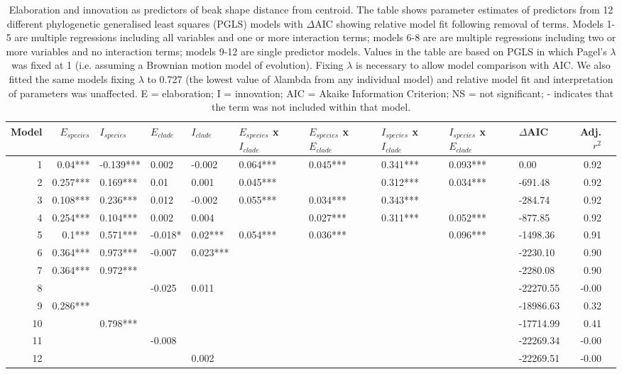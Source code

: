 \documentclass[12pt,letterpaper]{article}
\begin{document}
\begin{landscape}
\begin{table}[ht]
\centering
\small
   \begin{tabular}{rrllllllllrr}
     \hline
    Model & $E_{species}$ & $I_{species}$ & $E_{clade}$ & $I_{clade}$ & $E_{species}$ x $I_{clade}$ & $E_{species}$ x $E_{clade}$ & $I_{species}$ x $I_{clade}$ & $I_{species}$ x $E_{clade}$ & $\Delta$AIC & Adj. $r^2$ \\ 
     \hline
   1 & 0.04*** & -0.139*** & 0.002 & -0.002 & 0.064*** & 0.045*** & 0.341*** & 0.093*** & 0.00 & 0.92 \\ 
   2 & 0.257*** & 0.169*** & 0.01 & 0.001 & 0.045*** &  & 0.312*** & 0.034*** & -691.48 & 0.92 \\ 
   3 & 0.108*** & 0.236*** & 0.012 & -0.002 & 0.055*** & 0.034*** & 0.343*** &  & -284.74 & 0.92 \\ 
   4 & 0.254*** & 0.104*** & 0.002 & 0.004 &  & 0.027*** & 0.311*** & 0.052*** & -877.85 & 0.92 \\ 
   5 & 0.1*** & 0.571*** & -0.018* & 0.02*** & 0.054*** & 0.036*** &  & 0.096*** & -1498.36 & 0.91 \\ 
   6 & 0.364*** & 0.973*** & -0.007 & 0.023*** &  &  &  &  & -2230.10 & 0.90 \\ 
   7 & 0.364*** & 0.972*** &  &  &  &  &  &  & -2280.08 & 0.90 \\ 
   8 &  &  & -0.025 & 0.011 &  &  &  &  & -22270.55 & -0.00 \\ 
   9 & 0.286*** &  &  &  &  &  &  &  & -18986.63 & 0.32 \\ 
   10 &  & 0.798*** &  &  &  &  &  &  & -17714.99 & 0.41 \\ 
   11 &  &  & -0.008 &  &  &  &  &  & -22269.34 & -0.00 \\ 
   12 &  &  &  & 0.002 &  &  &  &  & -22269.51 & -0.00 \\ 
      \hline
   \end{tabular}
\caption{Elaboration and innovation as predictors of beak shape distance from centroid.
The table shows parameter estimates of predictors from  12 different phylogenetic generalised least squares (PGLS) models with $\Delta$AIC showing relative model fit following removal of terms. Models 1-5 are multiple regressions including all variables and one or more interaction terms; models 6-8 are are multiple regressions including two or more variables and no interaction terms; models 9-12 are single predictor models. Values in the table are based on PGLS in which Pagel’s $\lambda$ was fixed at 1 (i.e. assuming a Brownian motion model of evolution). Fixing $\lambda$ is necessary to allow model comparison with AIC. We also fitted the same models fixing $\lambda$ to 0.727 (the lowest value of $\lambda$lambda from any individual model) and relative model fit and interpretation of parameters was unaffected. E = elaboration; I = innovation; AIC = Akaike Information Criterion; NS = not significant; - indicates that the term was not included within that model.}
\label{Tab:pgls}
\end{table}
\end{landscape}
\end{document}

